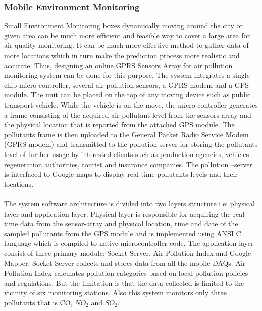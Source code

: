 \subsubsection{Mobile Environment Monitoring}
Small Environment Monitoring boxes dynamically moving around the city or given area can be much more efficient and feasible way to cover a large area for air quality monitoring. It can be much more effective method to gather data of more locations which in turn make the prediction process more realistic and accurate. Thus, designing an online GPRS Sensors Array for air pollution monitoring system can be done for this purpose. The system integrates a single chip micro controller, several air pollution sensors, a GPRS modem and a GPS module. The unit can be placed on the top of any moving device such as public transport vehicle. While the vehicle is on the move, the micro controller generates a frame consisting of the acquired air pollutant level from the sensors array and the physical location that is reported from the attached GPS module. The pollutants frame is then uploaded to the General Packet Radio Service Modem (GPRS-modem) and transmitted to the pollution-server for storing the pollutants level of further usage by interested clients such as production agencies, vehicles regeneration authorities, tourist and insurance companies. The pollution –server is interfaced to Google maps to display real-time pollutants levels and their locations. 
\\
\\
The system software architecture is divided into two layers structure i.e; physical layer and application layer. Physical layer is responsible for acquiring the real time data from the sensor-array and physical location, time and date of the sampled pollutants from the GPS module and is implemented using ANSI C language which is compiled to native microcontroller code. The application layer consist of three primary module: Socket-Server, Air Pollution Index and Google-Mapper. Socket-Server collects and stores data from all the mobile-DAQs. Air Pollution Index calculates pollution categories based on local pollution policies and regulations. But the limitation is that the data collected is limited to the vicinity of six monitoring stations. Also this system monitors only three pollutants that is CO, $NO_2$ and $SO_2$.

